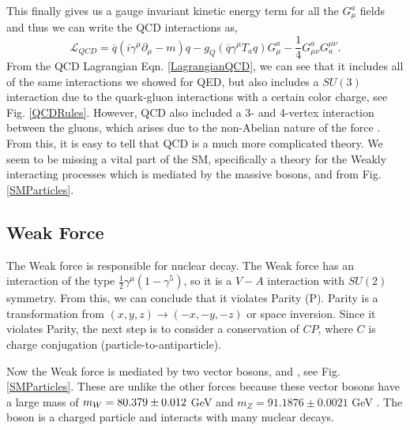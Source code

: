 This finally gives us a gauge invariant kinetic energy term for all the $G_\mu^a$ fields and thus we can write the QCD interactions as,
\begin{equation}\label{LagrangianQCD}
\mathcal{L}_{QCD}=\overline{q}(i\gamma^\mu\partial_\mu-m)q-g_Q(\overline{q}\gamma^\mu T_a q)G^a_\mu-\frac{1}{4}G^a_{\mu\nu}G_a^{\mu\nu}.
\end{equation}
From the QCD Lagrangian Eqn. \ref{LagrangianQCD}, we can see that it includes all of the same interactions we showed for QED, but also includes a $SU(3)$ interaction due to the quark-gluon interactions with a certain color charge, see Fig. \ref{QCDRules}. However, QCD also included a 3- and 4-vertex interaction between the gluons, which arises due to the non-Abelian nature of the force \cite{halzen_quarks_1984, peskin_introduction_1995}. From this, it is easy to tell that QCD is a much more complicated theory. We seem to be missing a vital part of the SM, specifically a theory for the Weakly interacting processes which is mediated by the massive bosons, \W{} and \Z{} from Fig. \ref{SMParticles}. 

\subsection{Weak Force}
\label{WeakForce}

The Weak force is responsible for nuclear decay. The Weak force has an interaction of the type $\frac{1}{2}\gamma^\mu(1-\gamma^5)$, so it is a $V-A$ interaction with $SU(2)$ symmetry. From this, we can conclude that it violates Parity (P). Parity is a transformation from $(x, y, z)\rightarrow(-x,-y,-z)$ or space inversion. Since it violates Parity, the next step is to consider a conservation of $CP$, where $C$ is charge conjugation (particle-to-antiparticle). 

Now the Weak force is mediated by two vector bosons, \W{} and \Z, see Fig. \ref{SMParticles}. These are unlike the other forces because these vector bosons have a large mass of $m_{W}=80.379\pm0.012$ GeV and $m_Z=91.1876\pm0.0021$ GeV \cite{particle_data_group_review_2018}. The \W{} boson is a charged particle and interacts with many nuclear decays. 


